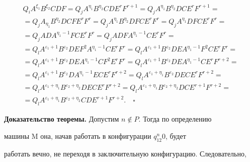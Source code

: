 \begin{multline*} 


Q_i A^{\xi_1}B^{\xi_2}C D F=Q_j A^{\eta_1}B^{\eta_2} 


C D E^r F^{r+1}=Q_j A^{\eta_1}B^{\eta_2}D C E^r F^{r+1}=\\ 


=Q_j A_{\eta_1}B^{\eta_2}D C F E^r F^r=Q_j A^{\eta_1}B^{\eta_2} 


D F C E^r F^r=Q_j A^{\eta_1}D F C E^r F^r =\\ 


=Q_j A D A^{\eta_1-1}F C E^r F^r=Q_j A D F A^{\eta_1-1}C E^r F^r=\\ 


=Q_l A^{\varepsilon_1+1}B^{\varepsilon_2}D E F^2A^{\eta_1-1} 


C E^r F^r=Q_l A^{\varepsilon_1+1}B^{\varepsilon_2} 


D E A^{\eta_1-1}F^2C E^r F^r=\\ 


=Q_l A^{\varepsilon_1+1}B^{\varepsilon_2}D E A^{\eta_1-1} 


C F^2E^r F^r=Q_l A^{\varepsilon_1+1}B^{\varepsilon_2} 


D E A^{\eta_1-1}C E^r F^{r+2}= \\ 


=Q_l A^{\varepsilon_1+1}B^{\varepsilon_2}D A^{\eta_1-1} 


E C E^r F^{r+2}=Q_l A^{\varepsilon_1+\eta_1} 


B^{\varepsilon_2}D E C E^r F^{r+2}= \\ 


=Q_l A^{\varepsilon_1+\eta_1}B^{\varepsilon_2+\eta_2} 


D E C E^r F^{r+2}=Q_l A^{\varepsilon_1+\eta_1} 


B^{\varepsilon_2+\eta_2}D C E^{r+1}F^{r+2}=\\ 


=Q_l A^{\varepsilon_1+\eta_1}B^{\varepsilon_2+\eta_2} 


C D E^{r+1}F^{r+2}.\quad\square 


\end{multline*} 


 


{\bf Доказательство теоремы.} Допустим $n\notin P$. Тогда по определению  


машины M она, начав работать в конфигурации $q_12^n0$, будет  


работать вечно, не переходя в заключительную конфигурацию. Следовательно,  


